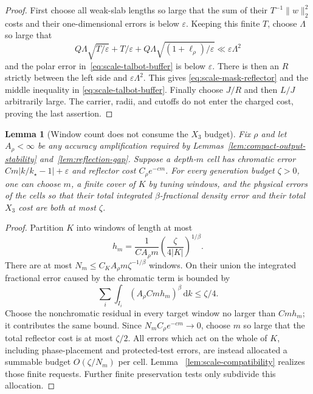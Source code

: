 \documentclass[11pt]{article}
\newtheorem{lemma}[theorem]{Lemma}
\theoremstyle{remark}
\newcommand{\dd}{\,\mathrm d}
\begin{document}
\begin{proof}
First choose all weak-slab lengths so large that the sum of their
$T^{-1}\|w\|_2^2$ costs and their one-dimensional errors is below
$\varepsilon$.  Keeping this finite $T$, choose $\Lambda$ so large that
\[
 Q\Lambda\sqrt{T/\varepsilon}
 +T/\varepsilon
 +Q\Lambda\sqrt{(1+\ell_\rho)/\varepsilon}
 \ll \varepsilon\Lambda^2
\]
and the polar error in~\eqref{eq:scale-talbot-buffer} is below
$\varepsilon$.  There is then an $R$ strictly between the left side and
$\varepsilon\Lambda^2$.  This gives
\eqref{eq:scale-mask-reflector} and the middle inequality in
\eqref{eq:scale-talbot-buffer}.  Finally choose $J/R$ and then $L/J$
arbitrarily large.  The carrier, radii, and cutoffs do not enter the charged
cost, proving the last assertion.
\end{proof}

\begin{lemma}[Window count does not consume the $X_3$ budget]
\label{lem:window-cost}
Fix $\rho$ and let $A_\rho<\infty$ be any accuracy amplification required by
Lemmas~\ref{lem:compact-output-stability} and~\ref{lem:reflection-gap}.
Suppose a depth-$m$ cell has chromatic error
$Cm|k/k_\star-1|+\varepsilon$ and reflector cost
$C_\rho e^{-cm}$.  For every generation budget $\zeta>0$, one can choose
$m$, a finite cover of $K$ by tuning windows, and the physical errors of the
cells so that their total integrated $\beta$-fractional density error and
their total $X_3$ cost are both at most $\zeta$.
\end{lemma}

\begin{proof}
Partition $K$ into windows of length at most
\[
 h_m=\frac1{C A_\rho m}
      \left(\frac{\zeta}{4|K|}\right)^{1/\beta}.
\]
There are at most
$N_m\leq C_KA_\rho m\zeta^{-1/\beta}$ windows.  On their union the integrated
fractional error caused by the chromatic term is bounded by
\[
 \sum_i\int_{I_i}(A_\rho Cm h_m)^\beta\dd k
 \leq\zeta/4.
\]
Choose the nonchromatic residual in every target window no larger than
$Cm h_m$; it contributes the same bound.  Since
$N_mC_\rho e^{-cm}\to0$, choose $m$ so large that the total reflector cost is
at most $\zeta/2$.  All errors which act on the whole of $K$, including
phase-placement and protected-test errors, are instead allocated a summable
budget $O(\zeta/N_m)$ per cell.  Lemma
~\ref{lem:scale-compatibility} realizes those finite requests.  Further
finite preservation tests only subdivide this allocation.
\end{proof}
\end{document}
